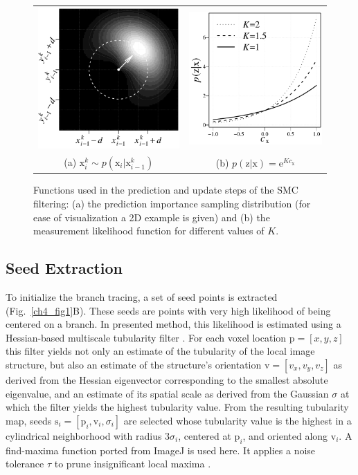 \begin{figure}
	\centering
	\begin{tabular}{cc}
		\includegraphics[width=0.35\columnwidth]{fig2a} &
		\includegraphics[width=0.35\columnwidth]{fig2b} \\ %
		(a) $\mathrm{x}_{i}^k \sim p(\mathrm{x}_i | \mathrm{x}_{i-1}^k)$ & \hspace{2em} 
		(b) $p(\mathrm{z} | \mathrm{x})=\textrm{e}^{Kc_{\mathrm{x}}}$ \\
	\end{tabular}
	\caption{Functions used in the prediction and update steps of the SMC filtering: (a) the prediction importance sampling distribution (for ease of visualization a 2D example is given) and (b) the measurement likelihood function for different values of $K$.}
	\label{ch4_fig2}
\end{figure}

\subsection{Seed Extraction}
\label{subsec:seed-extraction}
To initialize the branch tracing, a set of seed points is extracted (Fig.~\ref{ch4_fig1}B). These seeds are points with very high likelihood of being centered on a branch. In presented method, this likelihood is estimated using a Hessian-based multiscale tubularity filter \cite{frangi1998multiscale}. For each voxel location $\mathrm{p} = [x,y,z]$ this filter yields not only an estimate of the tubularity of the local image structure, but also an estimate of the structure's orientation $\mathrm{v} = [ v_x, v_y, v_z ]$ as derived from the Hessian eigenvector corresponding to the smallest absolute eigenvalue, and an estimate of its spatial scale as derived from the Gaussian $\sigma$ at which the filter yields the highest tubularity value. From the resulting tubularity map, seeds $\mathrm{s}_i = [ \mathrm{p}_i, \mathrm{v}_i, \sigma_i ]$ are selected whose tubularity value is the highest in a cylindrical neighborhood with radius $3\sigma_i$, centered at $\mathrm{p}_i$, and oriented along $\mathrm{v}_i$. A find-maxima function ported from ImageJ is used here. It applies a noise tolerance $\tau$ to prune insignificant local maxima \cite{ferreira2012imagej}.

